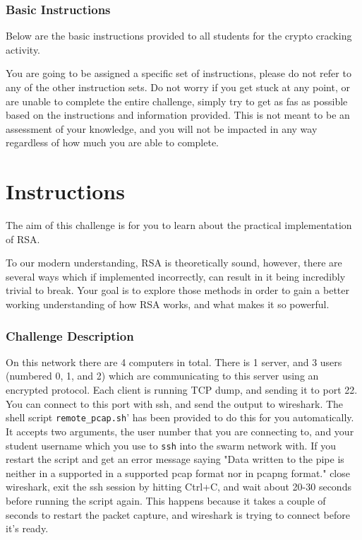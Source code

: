         \subsubsection{Basic Instructions}
            \noindent
            Below are the basic instructions provided to all students for the crypto cracking activity.
            {\parindent0pt\singlespacing                
                    You are going to be assigned a specific set of instructions, please do not refer to any of the other instruction sets.
                    Do not worry if you get stuck at any point, or are unable to complete the entire challenge, simply try to get as fas as possible based on the instructions and information provided. This is not meant to be an assessment of your knowledge, and you will not be impacted in any way regardless of how much you are able to complete. 
                
                \section*{Instructions}
                    The aim of this challenge is for you to learn about the practical implementation of RSA.

                    To our modern understanding, RSA is theoretically sound, however, there are several ways which if implemented incorrectly, can result in it being incredibly trivial to break. 
                    Your goal is to explore those methods in order to gain a better working understanding of how RSA works, and what makes it so powerful. 
                \subsubsection*{Challenge Description}
                    On this network there are 4 computers in total. 
                    There is 1 server, and 3 users (numbered 0, 1, and 2) which are communicating to this server using an encrypted protocol. 
                    Each client is running TCP dump, and sending it to port 22. You can connect to this port with ssh, and send the output to wireshark.
                    The shell script \lstinline`remote_pcap.sh`' has been provided to do this for you automatically. 
                    It accepts two arguments, the user number that you are connecting to, and your student username which you use to \lstinline`ssh` into the swarm network with.
                    If you restart the script and get an error message saying "Data written to the pipe is neither in a supported in a supported pcap format nor in pcapng format."
                    close wireshark, exit the ssh session by hitting Ctrl+C, and wait about 20-30 seconds before running the script again.
                    This happens because it takes a couple of seconds to restart the packet capture, and wireshark is trying to connect before it's ready.

}
